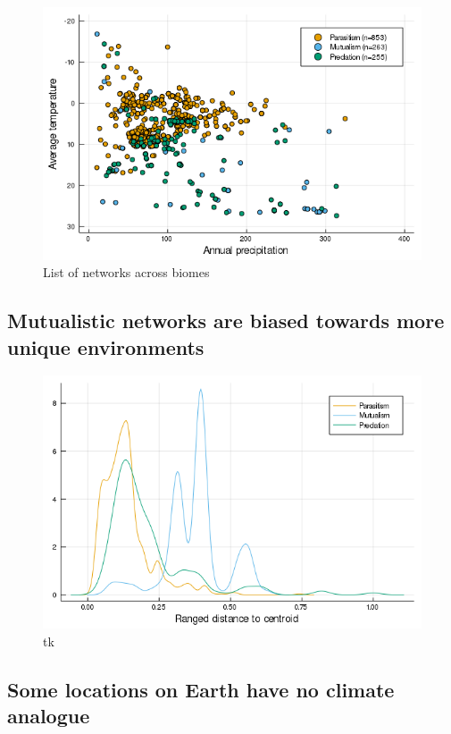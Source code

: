 \begin{figure}
\centering
\includegraphics{figures/figure_02.png}
\caption{List of networks across biomes\label{fig:biomes}}
\end{figure}

\hypertarget{mutualistic-networks-are-biased-towards-more-unique-environments}{%
\subsection{Mutualistic networks are biased towards more unique
environments}\label{mutualistic-networks-are-biased-towards-more-unique-environments}}

\begin{figure}
\centering
\includegraphics{figures/figure_05_b.png}
\caption{tk\label{fig:ecc}}
\end{figure}

\hypertarget{some-locations-on-earth-have-no-climate-analogue}{%
\subsection{Some locations on Earth have no climate
analogue}\label{some-locations-on-earth-have-no-climate-analogue}}


